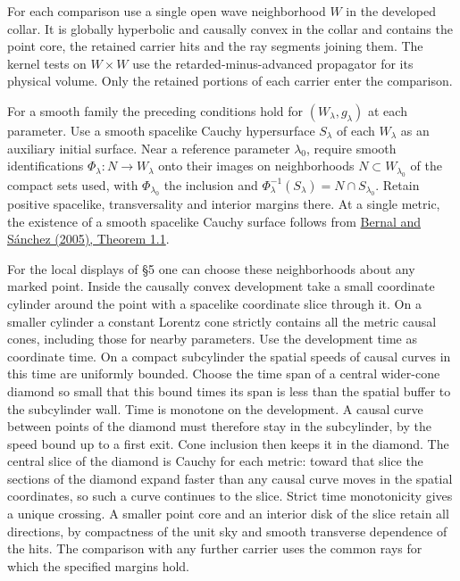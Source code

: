 \documentclass[
  english,
  11pt,
  reqno]{amsart}
\begin{document}
For each comparison use a single open wave neighborhood \(W\) in the
developed collar. It is globally hyperbolic and causally convex in the
collar and contains the point core, the retained carrier hits and the
ray segments joining them. The kernel tests on \(W\times W\) use the
retarded-minus-advanced propagator for its physical volume. Only the
retained portions of each carrier enter the comparison.

For a smooth family the preceding conditions hold for
\((W_\lambda,g_\lambda)\) at each parameter. Use a smooth spacelike
Cauchy hypersurface \(S_\lambda\) of each \(W_\lambda\) as an auxiliary
initial surface. Near a reference parameter \(\lambda_0\), require
smooth identifications \(\Phi_\lambda:N\to W_\lambda\) onto their images
on neighborhoods \(N\subset W_{\lambda_0}\) of the compact sets used,
with \(\Phi_{\lambda_0}\) the inclusion and
\(\Phi_\lambda^{-1}(S_\lambda)=N\cap S_{\lambda_0}\). Retain positive
spacelike, transversality and interior margins there. At a single
metric, the existence of a smooth spacelike Cauchy surface follows from
\hyperref[ref-BernalSanchez2005]{Bernal and Sánchez (2005), Theorem
1.1}.

For the local displays of §5 one can choose these neighborhoods about
any marked point. Inside the causally convex development take a small
coordinate cylinder around the point with a spacelike coordinate slice
through it. On a smaller cylinder a constant Lorentz cone strictly
contains all the metric causal cones, including those for nearby
parameters. Use the development time as coordinate time. On a compact
subcylinder the spatial speeds of causal curves in this time are
uniformly bounded. Choose the time span of a central wider-cone diamond
so small that this bound times its span is less than the spatial buffer
to the subcylinder wall. Time is monotone on the development. A causal
curve between points of the diamond must therefore stay in the
subcylinder, by the speed bound up to a first exit. Cone inclusion then
keeps it in the diamond. The central slice of the diamond is Cauchy for
each metric: toward that slice the sections of the diamond expand faster
than any causal curve moves in the spatial coordinates, so such a curve
continues to the slice. Strict time monotonicity gives a unique
crossing. A smaller point core and an interior disk of the slice retain
all directions, by compactness of the unit sky and smooth transverse
dependence of the hits. The comparison with any further carrier uses the
common rays for which the specified margins hold.
\end{document}
